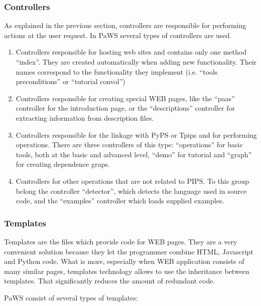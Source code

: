 \subsubsection{Controllers}

As explained in the previous section, controllers are responsible for
performing actions at the user request. In PaWS several types of
controllers are used.

\begin{enumerate}

\item Controllers responsible for hosting web sites and contains only
  one method ``index''. They are created automatically when adding new
  functionality. Their names correspond to the functionality they
  implement (i.e. ``tools preconditions'' or ``tutorial convol'')

\item Controllers responsible for creating special WEB pages, like the
  ``paas'' controller for the introduction page, or the
  ``descriptions'' controller for extracting information from
  description files.

\item Controllers responsible for the linkage with PyPS or Tpips and
  for performing operations. There are three controllers of this type:
  ``operations'' for basic tools, both at the basic and advanced
  level, ``demo'' for tutorial and ``graph'' for creating dependence
  graps.

\item Controllers for other operations that are not related to PIPS. To
  this group belong the controller ``detector'', which detects the
  language used in source code, and the ``examples'' controller which loads
  supplied examples.

\end{enumerate}

\subsubsection{Templates}

Templates are the files which provide code for WEB pages. They are a
very convenient solution because they let the programmer combine HTML,
Javascript and Python code. What is more, especially when WEB
application consists of many similar pages, templates technology
allows to use the inheritance between templates. That significantly
reduces the amount of redundant code.

PaWS consist of several types of templates:

